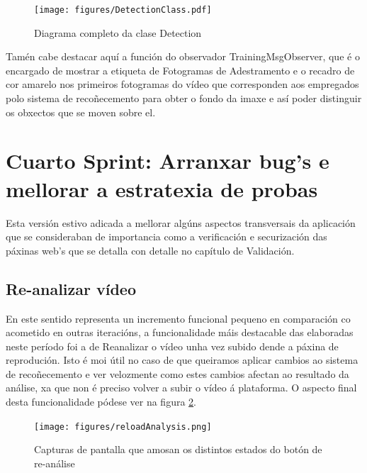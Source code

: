         
        \begin{figure}[htp]
        \begin{center}
            \texttt{[image: figures/DetectionClass.pdf]}
            \caption{Diagrama completo da clase Detection}
        \label{fig:DetectionClass}
        \end{center}
        \end{figure}
        
        Tamén cabe destacar aquí a función do observador TrainingMsgObserver, que é o encargado de 
        mostrar a etiqueta de Fotogramas de Adestramento e o recadro de cor amarelo nos primeiros 
        fotogramas do vídeo que corresponden aos empregados polo sistema de recoñecemento para obter o 
        fondo da imaxe e así poder distinguir os obxectos que se moven sobre el.
        
\section{Cuarto Sprint: Arranxar bug's e mellorar a estratexia de probas}
    
    Esta versión estivo adicada a mellorar algúns aspectos transversais da aplicación que se 
    consideraban de importancia como a verificación e securización das páxinas web's que se detalla 
    con detalle no capítulo de Validación.
    
    \subsection{Re-analizar vídeo}
    En este sentido representa un incremento funcional 
        pequeno en comparación co acometido en outras iteracións, a funcionalidade máis destacable
        das elaboradas neste período foi a de Reanalizar o vídeo unha vez subido dende a páxina de 
        reprodución. Isto é moi útil no caso de que queiramos aplicar cambios ao sistema de 
        recoñecemento e ver velozmente como estes cambios afectan ao resultado da análise, xa que non é
        preciso volver a subir o vídeo á plataforma. O aspecto final desta funcionalidade pódese 
        ver na figura \ref{fig:reloadAnalysis}.
    
        \begin{figure}[htp]
        \begin{center}
            \texttt{[image: figures/reloadAnalysis.png]}
            \caption{Capturas de pantalla que amosan os distintos estados do botón de re-análise}
        \label{fig:reloadAnalysis}
        \end{center}
        \end{figure}

